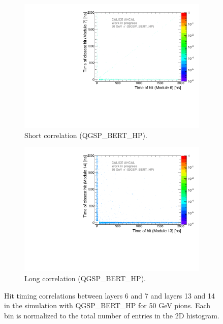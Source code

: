 \begin{figure}[htbp!]
	\begin{subfigure}[t]{0.5\textwidth}
		\centering
		\includegraphics[width=1\textwidth]{../Thesis_Plots/Timing/Pions/Plots/ComparisonToSim/Time_Correlation_50GeV_short_QGSPBERTHP.pdf}
		\caption{Short correlation (QGSP\_BERT\_HP).} \label{fig:Corr_short_QGSPBERTHP}
	\end{subfigure}
	\hfill
	\begin{subfigure}[t]{0.5\textwidth}
		\centering
		\includegraphics[width=1\textwidth]{../Thesis_Plots/Timing/Pions/Plots/ComparisonToSim/Time_Correlation_50GeV_long_QGSPBERTHP.pdf}
		\caption{Long correlation (QGSP\_BERT\_HP).} \label{fig:Corr_long_QGSPBERTHP}
	\end{subfigure}
	\caption{Hit timing correlations between layers 6 and 7 and layers 13 and 14 in the \mokka simulation with QGSP\_BERT\_HP for 50 GeV pions. Each bin is normalized to the total number of entries in the 2D histogram.}
	\label{fig:Corr_Mokka_Simulation}
\end{figure}

